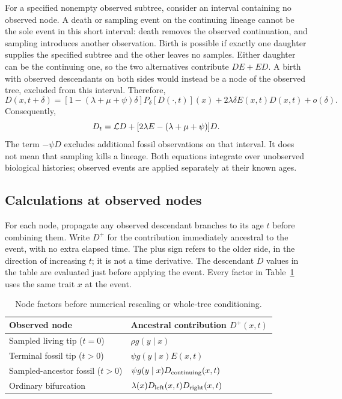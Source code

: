 \documentclass[11pt]{article}
\begin{document}
For a specified nonempty observed subtree, consider an interval containing no observed node.
A death or sampling event on the continuing lineage cannot be the sole event in this short
interval: death removes the observed continuation, and sampling introduces another observation. Birth is possible if exactly one daughter supplies
the specified subtree and the other leaves no samples. Either daughter can be the continuing
one, so the two alternatives contribute $DE+ED$. A birth with observed descendants on both
sides would instead be a node of the observed tree, excluded from this interval. Therefore,
\[
 D(x,t+\delta)
 = [1-(\lambda+\mu+\psi)\delta]P_\delta[D(\cdot,t)](x)
   +2\lambda\delta E(x,t)D(x,t)+o(\delta).
\]
Consequently,
\begin{equation}\label{eq:D}
 D_t=\mathcal{L} D+[2\lambda E-(\lambda+\mu+\psi)]D.
\end{equation}
The term $-\psi D$ excludes additional fossil observations on that interval. It does not mean
that sampling kills a lineage. Both equations integrate over unobserved biological histories;
observed events are applied separately at their known ages.

\subsection{Calculations at observed nodes}\label{sec:node-events}
For each node, propagate any observed descendant branches to its age $t$ before combining them.
Write $D^+$ for the contribution immediately ancestral to the event, with no extra elapsed time.
The plus sign refers to the older side, in the direction of increasing $t$; it is not a time
derivative. The descendant $D$ values in the table are evaluated just before applying the event.
Every factor in Table~\ref{tab:node-events} uses the same trait $x$ at the event.

\begin{table}[htbp]
\centering
\begin{tabular}{@{}ll@{}}
\toprule
Observed node & Ancestral contribution $D^+(x,t)$\\
\midrule
Sampled living tip ($t=0$) & $\rho g(y\mid x)$\\
Terminal fossil tip ($t>0$) & $\psi g(y\mid x)E(x,t)$\\
Sampled-ancestor fossil ($t>0$) & $\psi g(y\mid x)D_{\rm continuing}(x,t)$\\
Ordinary bifurcation & $\lambda(x)D_{\rm left}(x,t)D_{\rm right}(x,t)$\\
\bottomrule
\end{tabular}
\caption{Node factors before numerical rescaling or whole-tree conditioning.}
\label{tab:node-events}
\end{table}
\end{document}
